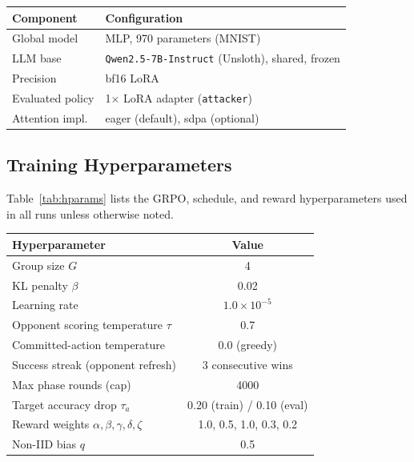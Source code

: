 \documentclass[conference,9pt]{IEEEtran}
\begin{document}
\begin{center}
\label{tab:llmconfig}
\small
\begin{tabular}{@{}ll@{}}
\toprule
\textbf{Component} & \textbf{Configuration} \\
\midrule
Global model & MLP, 970 parameters (MNIST) \\
LLM base & \texttt{Qwen2.5-7B-Instruct} (Unsloth), shared, frozen \\
Precision & bf16 LoRA \\
Evaluated policy & 1$\times$ LoRA adapter (\texttt{attacker}) \\
Attention impl. & eager (default), sdpa (optional) \\
\bottomrule
\end{tabular}
\end{center}

\subsection{Training Hyperparameters}
Table~\ref{tab:hparams} lists the GRPO, schedule, and reward hyperparameters used in all runs unless otherwise noted.

\begin{center}
\label{tab:hparams}
\small
\begin{tabular}{@{}lc@{}}
\toprule
\textbf{Hyperparameter} & \textbf{Value} \\
\midrule
Group size $G$ & 4 \\
KL penalty $\beta$ & 0.02 \\
Learning rate & $1.0\times10^{-5}$ \\
Opponent scoring temperature $\tau$ & 0.7 \\
Committed-action temperature & 0.0 (greedy) \\
Success streak (opponent refresh) & 3 consecutive wins \\
Max phase rounds (cap) & 4000 \\
Target accuracy drop $\tau_a$ & 0.20 (train) / 0.10 (eval) \\
Reward weights $\alpha,\beta,\gamma,\delta,\zeta$ & 1.0, 0.5, 1.0, 0.3, 0.2 \\
Non-IID bias $q$ & 0.5 \\
\bottomrule
\end{tabular}
\end{center}
\end{document}
